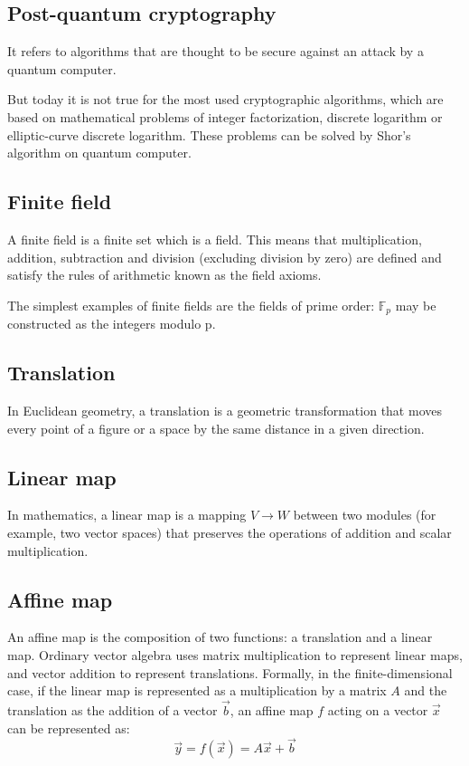 \documentclass[thesis=M,english]{FITthesis}[2019/12/23]
\begin{document}
\subsection{Post-quantum cryptography}
It refers to algorithms that are thought to be secure against an attack by a quantum computer.

But today it is not true for the most used cryptographic algorithms, which are based on mathematical problems of integer factorization, discrete logarithm or elliptic-curve discrete logarithm. These problems can be solved by Shor's algorithm on quantum computer.

\subsection{Finite field}
A finite field is a finite set which is a field. This means that multiplication, addition, subtraction and division (excluding division by zero) are defined and satisfy the rules of arithmetic known as the field axioms.

The simplest examples of finite fields are the fields of prime order: $\mathbb {F}_{p}$ may be constructed as the integers modulo p.

\subsection{Translation}
In Euclidean geometry, a translation is a geometric transformation that moves every point of a figure or a space by the same distance in a given direction.

\subsection{Linear map}
In mathematics, a linear map is a mapping $V \rightarrow W$ between two modules (for example, two vector spaces) that preserves the operations of addition and scalar multiplication.

\subsection{Affine map}
An affine map is the composition of two functions: a translation and a linear map. Ordinary vector algebra uses matrix multiplication to represent linear maps, and vector addition to represent translations. Formally, in the finite-dimensional case, if the linear map is represented as a multiplication by a matrix $A$ and the translation as the addition of a vector $\vec {b}$, an affine map $f$ acting on a vector ${\vec {x}}$ can be represented as:
\[
{\vec {y}}=f({\vec {x}})=A{\vec {x}}+{\vec {b}}
\]
\end{document}
